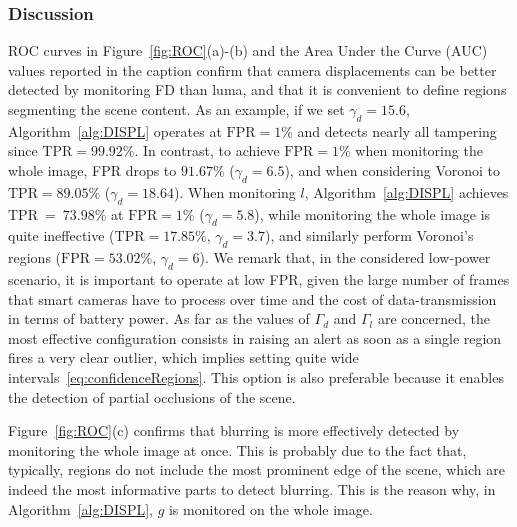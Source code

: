 \documentclass{llncs}
\newcommand{\gi}[1]{{\textcolor{red}{[\small \textbf{Giacomo}: #1]}}}
\begin{document}
\subsubsection{Discussion}
ROC curves in Figure~\ref{fig:ROC}(a)-(b) and the Area Under the Curve (AUC) values reported in the caption confirm that camera displacements can be better detected by monitoring FD than luma, and that it is convenient to define regions segmenting the scene content. As an example, if we set $\gamma_d = 15.6$, Algorithm~\ref{alg:DISPL} operates at $\text{FPR} = 1\%$ and detects nearly all tampering since $\text{TPR} = 99.92\%$. In contrast, to achieve $\text{FPR} = 1\%$ when monitoring the whole image, FPR drops to $91.67\%$ ($\gamma_d = 6.5$), and when considering Voronoi to $\text{TPR} = 89.05\%$ ($\gamma_d = 18.64$). When monitoring $l$, Algorithm~\ref{alg:DISPL} achieves TPR~=~$73.98\%$ at $\text{FPR}=1\%$  ($\gamma_d=5.8$), while monitoring the whole image is quite ineffective ($\text{TPR} = 17.85\%$, $\gamma_d=3.7$), and similarly perform Voronoi's regions ($\text{FPR} = 53.02\%$, $\gamma_d=6$). We remark that, in the considered low-power scenario, it is important to operate at low FPR, given the large number of frames that smart cameras have to process over time and the cost of data-transmission in terms of battery power. As far as the values of $\Gamma_d$ and $\Gamma_l$ are concerned, the most effective configuration consists in raising an alert as soon as a single region fires a very clear outlier, which implies setting quite wide intervals~\eqref{eq:confidenceRegions}. This option is also preferable because it enables the detection of partial occlusions of the scene.

Figure~\ref{fig:ROC}(c) confirms that blurring is more effectively detected by monitoring the whole image at once. This is probably due to the fact that, typically, regions do not include the most prominent edge of the scene, which are indeed the most informative parts to detect blurring. This is the reason why, in Algorithm~\ref{alg:DISPL}, $g$ is monitored on the whole image.%
\end{document}
